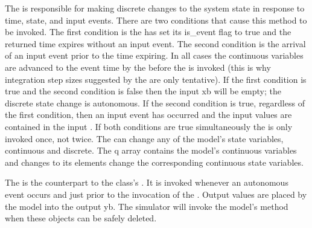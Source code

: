 The  is responsible for making discrete changes to the system state in response to time, state, and input events. There are two conditions that cause this method to be invoked. The first condition is the  has set its is\_event flag to true and the returned time expires without an input event. The second condition is the arrival of an input event prior to the  time expiring. In all cases the continuous variables are advanced to the event time by the  before the  is invoked (this is why integration step sizes suggested by the  are only tentative). If the first condition is true and the second condition is false then the input  xb will be empty; the discrete state change is autonomous. If the second condition is true, regardless of the first condition, then an input event has occurred and the input values are contained in the input . If both conditions are true simultaneously the  is only invoked once, not twice. The  can change any of the model's state variables, continuous and discrete. The q array contains the model's continuous variables and changes to its elements change the corresponding continuous state variables.

The  is the counterpart to the  class's . It is invoked whenever an autonomous event occurs and just prior to the invocation of the . Output values are placed by the model into the output  yb. The simulator will invoke the model's  method when these objects can be safely deleted.

